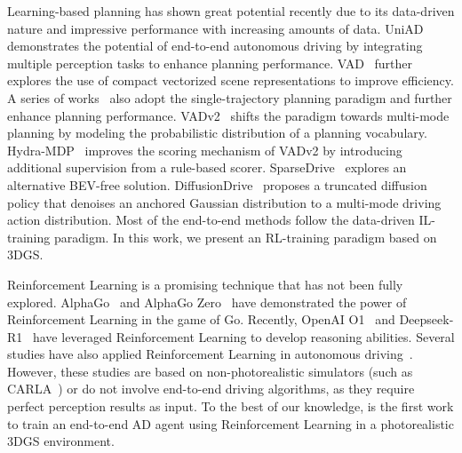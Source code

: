   Learning-based planning has shown great potential recently due to its data-driven nature and impressive performance with increasing amounts of data. UniAD~\cite{hu2023planning} demonstrates the potential of end-to-end autonomous driving by integrating multiple perception tasks to enhance planning performance. VAD~\cite{jiang2023vad} further explores the use of compact vectorized scene representations to improve efficiency. A series of works~\cite{li2024enhancing,paradrive,zheng2024genad,li2024ego,wang2024driving,gu2024producing,chen2025ppad,transfuser} also adopt the single-trajectory planning paradigm and further enhance planning performance. VADv2~\cite{vadv2} shifts the paradigm towards multi-mode planning by modeling the probabilistic distribution of a planning vocabulary. Hydra-MDP~\cite{hydramdp} improves the scoring mechanism of VADv2 by introducing additional supervision from a rule-based scorer. SparseDrive~\cite{sun2024sparsedrive} explores an alternative BEV-free solution. DiffusionDrive~\cite{diffusiondrive} proposes a truncated diffusion policy that denoises an anchored Gaussian distribution to a multi-mode driving action distribution. Most of the end-to-end methods follow the data-driven IL-training paradigm. In this work, we present an RL-training paradigm based on 3DGS.

Reinforcement Learning is a promising technique that has not been fully explored. AlphaGo~\cite{alphago} and AlphaGo Zero~\cite{alphago-zero} have demonstrated the power of Reinforcement Learning in the game of Go. Recently, OpenAI O1~\cite{openai-o1} and Deepseek-R1~\cite{deepseek-r1} have leveraged Reinforcement Learning to develop reasoning abilities. Several studies have also applied Reinforcement Learning in autonomous driving~\cite{toromanoff2020end, chen2021learning, roach, ILNotEnough, GUMP}. However, these studies are based on non-photorealistic simulators (such as CARLA~\cite{carla}) or do not involve end-to-end driving algorithms, as they require perfect perception results as input. To the best of our knowledge, \thename{} is the first work to train an end-to-end AD agent using Reinforcement Learning in a photorealistic 3DGS environment.